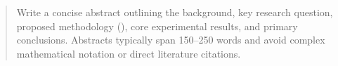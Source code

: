 \begin{abstract}
Write a concise abstract outlining the background, key research question, proposed methodology (\sister{}), core experimental results, and primary conclusions.
Abstracts typically span 150--250 words and avoid complex mathematical notation or direct literature citations.
\end{abstract}
